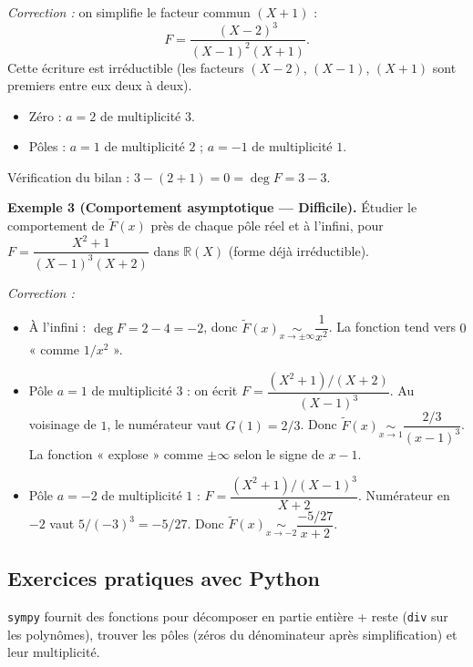 \textit{Correction :} on simplifie le facteur commun $(X + 1)$ :
\[ F = \frac{(X - 2)^3}{(X - 1)^2 (X + 1)}. \]
Cette écriture est irréductible (les facteurs $(X - 2)$, $(X - 1)$, $(X + 1)$ sont premiers entre eux deux à deux).
\begin{itemize}
    \item Zéro : $a = 2$ de multiplicité $3$.
    \item Pôles : $a = 1$ de multiplicité $2$ ; $a = -1$ de multiplicité $1$.
\end{itemize}
Vérification du bilan : $3 - (2 + 1) = 0 = \deg F = 3 - 3$. \checkmark

\medskip

\textbf{Exemple 3 (Comportement asymptotique --- Difficile).}
Étudier le comportement de $\widetilde{F}(x)$ près de chaque pôle réel et à l'infini, pour $F = \dfrac{X^2 + 1}{(X - 1)^3 (X + 2)}$ dans $\mathbb{R}(X)$ (forme déjà irréductible).

\textit{Correction :}
\begin{itemize}
    \item À l'infini : $\deg F = 2 - 4 = -2$, donc $\widetilde{F}(x) \underset{x \to \pm \infty}{\sim} \dfrac{1}{x^2}$. La fonction tend vers $0$ « comme $1/x^2$ ».
    \item Pôle $a = 1$ de multiplicité $3$ : on écrit $F = \dfrac{(X^2 + 1)/(X + 2)}{(X - 1)^3}$. Au voisinage de $1$, le numérateur vaut $G(1) = 2/3$. Donc $\widetilde{F}(x) \underset{x \to 1}{\sim} \dfrac{2/3}{(x - 1)^3}$. La fonction « explose » comme $\pm \infty$ selon le signe de $x - 1$.
    \item Pôle $a = -2$ de multiplicité $1$ : $F = \dfrac{(X^2 + 1)/(X - 1)^3}{X + 2}$. Numérateur en $-2$ vaut $5 / (-3)^3 = -5/27$. Donc $\widetilde{F}(x) \underset{x \to -2}{\sim} \dfrac{-5/27}{x + 2}$.
\end{itemize}

\subsection{Exercices pratiques avec Python}
\texttt{sympy} fournit des fonctions pour décomposer en partie entière + reste (\texttt{div} sur les polynômes), trouver les pôles (zéros du dénominateur après simplification) et leur multiplicité.


